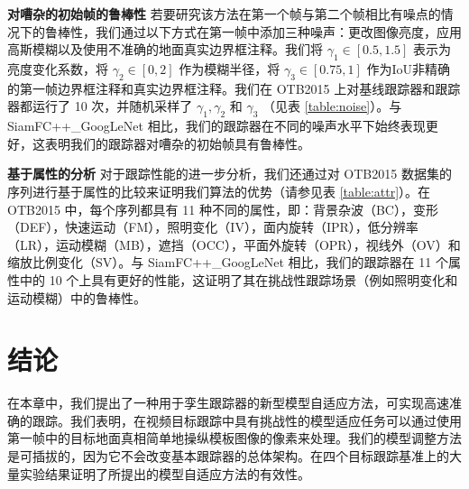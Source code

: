 \textbf{对嘈杂的初始帧的鲁棒性} 若要研究该方法在第一个帧与第二个帧相比有噪点的情况下的鲁棒性，我们通过以下方式在第一帧中添加三种噪声：更改图像亮度，应用高斯模糊以及使用不准确的地面真实边界框注释。我们将 $\gamma_1 \in [0.5, 1.5]$ 表示为亮度变化系数，将 $\gamma_2 \in [0, 2]$ 作为模糊半径，将 $\gamma_3 \in [0.75, 1]$ 作为IoU非精确的第一帧边界框注释和真实边界框注释。我们在 OTB2015 上对基线跟踪器和跟踪器都运行了 10 次，并随机采样了 $\gamma_1, \gamma_2$ 和 $\gamma_3$ （见表 \ref{table:noise}）。与 SiamFC++\_GoogLeNet \cite{SiamFC++} 相比，我们的跟踪器在不同的噪声水平下始终表现更好，这表明我们的跟踪器对嘈杂的初始帧具有鲁棒性。%

\textbf{基于属性的分析} 对于跟踪性能的进一步分析，我们还通过对 OTB2015 数据集的序列进行基于属性的比较来证明我们算法的优势（请参见表 \ref{table:attr}）。在 OTB2015 中，每个序列都具有 11 种不同的属性，即：背景杂波（BC），变形（DEF），快速运动（FM），照明变化（IV），面内旋转（IPR），低分辨率（LR），运动模糊（MB），遮挡（OCC），平面外旋转（OPR），视线外（OV）和缩放比例变化（SV）。与 SiamFC++\_GoogLeNet \cite{SiamFC++} 相比，我们的跟踪器在 11 个属性中的 10 个上具有更好的性能，这证明了其在挑战性跟踪场景（例如照明变化和运动模糊）中的鲁棒性。

\section{结论}
在本章中，我们提出了一种用于孪生跟踪器的新型模型自适应方法，可实现高速准确的跟踪。我们表明，在视频目标跟踪中具有挑战性的模型适应任务可以通过使用第一帧中的目标地面真相简单地操纵模板图像的像素来处理。我们的模型调整方法是可插拔的，因为它不会改变基本跟踪器的总体架构。在四个目标跟踪基准上的大量实验结果证明了所提出的模型自适应方法的有效性。